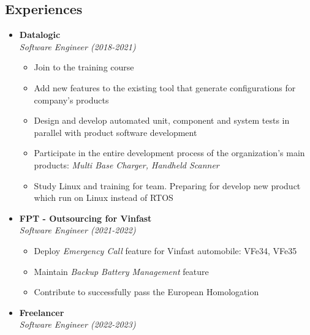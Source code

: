 \documentclass[11pt,oneside,a4paper]{article}
\begin{document}
\begin{tcolorbox}
\begin{minipage}[t]{11cm}
\begin{tcolorbox}[grow to right by=0.75cm,colback=white,colframe=white]
            \section*{Experiences}
            \begin{itemize}
                \item 
                {
                    \textbf{Datalogic} \\
                    \emph{Software Engineer (2018-2021)}
                    \begin{itemize}[label=$\circ$]
                        \item {Join to the training course}
                        \item {Add new features to the existing tool that generate configurations for company's products}
                        \item {Design and develop automated unit, component and system tests in 
                        parallel with product software development}
                        \item {Participate in the entire development process of the organization's main products: 
                        \textit{Multi Base Charger, Handheld Scanner}}
                        \item {Study Linux and training for team. Preparing for develop new product which run on Linux instead of RTOS}
                    \end{itemize}
                }
                \item
                {
                    \textbf{FPT - Outsourcing for Vinfast} \\
                    \emph{Software Engineer (2021-2022)}
                    \begin{itemize}[label=$\circ$]
                        \item {Deploy \textit{Emergency Call} feature for Vinfast automobile: VFe34, VFe35}
                        \item {Maintain \textit{Backup Battery Management} feature}
                        \item {Contribute to successfully pass the European Homologation}
                    \end{itemize}
                }
                \item 
                {
                    \textbf{Freelancer} \\
                    \emph{Software Engineer (2022-2023)} \\
}
\end{itemize}
\end{tcolorbox}
\end{minipage}
\end{tcolorbox}
\end{document}
